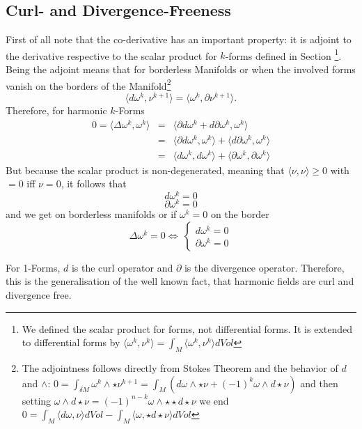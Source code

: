\subsection{Curl- and Divergence-Freeness}
First of all note that the co-derivative has an important property: it is adjoint to the derivative respective to the scalar product for $k$-forms defined in Section \footnote{We defined the scalar product for forms, not differential forms. It is extended to differential forms by $\langle\omega^k,\nu^k \rangle = \int_M \langle \omega^k,\nu^k\rangle dVol$}. Being the adjoint means that for borderless Manifolds or when the involved forms vanish on the borders of the Manifold\footnote{The adjointness follows directly from Stokes Theorem and the behavior of $d$ and $\wedge$: $0=\int_{\delta M} \omega^k\wedge \star \nu^{k+1} = \int_M (d\omega\wedge\star \nu + (-1)^k\omega\wedge d\star \nu)$ and then setting $\omega\wedge d\star\nu = (-1)^{n-k}\omega\wedge \star \star d\star\nu$ we end $0= \int_M \langle d\omega,\nu\rangle dVol  - \int_M \langle \omega,\star d \star\nu \rangle dVol$}
\[\langle d\omega^k, \nu^{k+1} \rangle = \langle \omega^k,\partial\nu^{k+1}\rangle.\]
Therefore, for harmonic $k$-Forms
\begin{eqnarray*}0=\langle\Delta\omega^k,\omega^k\rangle &= &\langle \partial d\omega^k + d \partial \omega^k, \omega^k\rangle \\
 &=& \langle \partial d\omega^k, \omega^k\rangle + \langle d \partial \omega^k, \omega^k\rangle \\
 &=& \langle d\omega^k,d\omega^k\rangle + \langle \partial\omega^k,\partial\omega^k\rangle
\end{eqnarray*}
But because the scalar product is non-degenerated, meaning that $\langle \nu,\nu\rangle \geq 0$  with $=0$ iff $\nu=0$, it follows that
\[d\omega^k = 0\]
\[\partial\omega^k = 0\]
and we get on borderless manifolds or if $\omega^k = 0$ on the border
\[\Delta \omega^k = 0 \Leftrightarrow \: \left\{\begin{matrix}
d\omega^k = 0\\
\partial \omega^k = 0
\end{matrix}\right.\]

For 1-Forms, $d$ is the curl operator and $\partial$ is the divergence operator. Therefore, this is the generalisation of the well known fact, that harmonic fields are curl and divergence free. 

